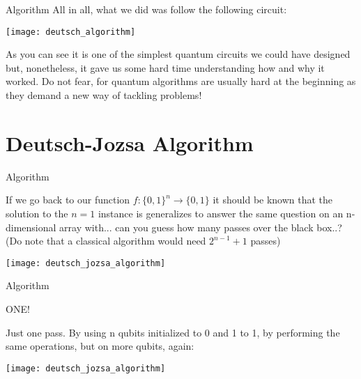 \documentclass[aspectratio=43]{beamer}
\begin{document}
\begin{frame}{\ds Algorithm}
All in all, what we did was follow the following circuit:
\begin{center}
    \texttt{[image: deutsch\_algorithm]}
\end{center}
\begin{cardTiny}
    As you can see it is one of the simplest quantum circuits we could have designed but, nonetheless, it gave us some hard time understanding how and why it worked. Do not fear, for quantum algorithms are usually hard at the beginning as they demand a new way of tackling problems!
\end{cardTiny}
\pagenumber
\end{frame}

\section{Deutsch-Jozsa Algorithm}
\begin{frame}{\djs Algorithm}
\begin{card}
    If we go back to our function $f: \{0,1\}^n \rightarrow \{0,1\}$ it should be known that the solution to the $n=1$ instance is generalizes to answer the same question on an n-dimensional array with... can you guess how many passes over the black box..? \small{(Do note that a classical algorithm would need $2^{n-1}+1$ passes)}
    \begin{center}
        \texttt{[image: deutsch\_jozsa\_algorithm]}
    \end{center}
\end{card}
\pagenumber
\end{frame}

\begin{frame}{\djs Algorithm}
\begin{cardTiny}
    \begin{center}
        \Large{ONE!}
    \end{center}
\end{cardTiny}
\begin{card}
    Just one pass. By using n qubits initialized to 0 and 1 to 1, by performing the same operations, but on more qubits, again:
    \begin{center}
        \texttt{[image: deutsch\_jozsa\_algorithm]}
    \end{center}
\end{card}
\pagenumber
\end{frame}
\end{document}
